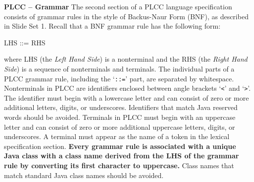 \begin{minipage}[t]{\sw}
\slidenumber
\LARGE
{\bf PLCC -- Grammar}\exx
The second section of a PLCC language specification
consists of grammar rules in the style of Backus-Naur Form (BNF),
as described in Slide Set 1.
Recall that a BNF grammar rule has the following form:
\begin{qv}
LHS ::= RHS
\end{qv}
where LHS (the {\em Left Hand Side}) is a nonterminal
and the RHS (the {\em Right Hand Side}) is a sequence
of nonterminals and terminals.
The individual parts of a PLCC grammar rule,
including the `\verb'::='' part,
are separated by whitespace.\exx
Nonterminals in PLCC are identifiers enclosed
between angle brackets `\verb'<'' and `\verb'>''.
The identifier must begin with a lowercase letter
and can consist of zero or more additional letters, digits, or underscores.
Identifiers that match Java reserved words should be avoided.\exx
Terminals in PLCC must begin with an uppercase letter
and can consist of zero or more additional uppercase letters, digits,
or underscores.
A terminal must appear as the name of a token
in the lexical specification section.\exx
{\bf Every grammar rule is associated
with a unique Java class with a class name derived
from the LHS of the grammar rule by converting its first character
to uppercase.}
Class names that match standard Java class names should be avoided.
\end{minipage}
\clearpage
